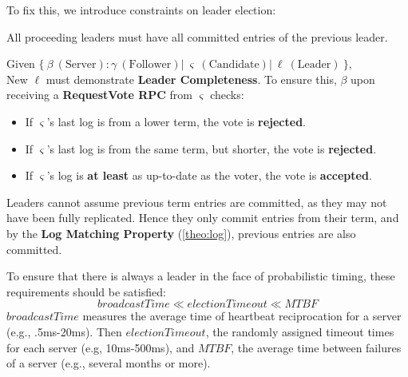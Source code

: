 \noindent
To fix this, we introduce constraints on leader election:

\begin{Def}

    All proceeding leaders must have all committed entries of the previous leader.
\end{Def}

\begin{Def}

    Given $\{\ \beta\ (\text{Server}): \gamma\ (\text{Follower})  |\ \varsigma\ (\text{Candidate}) |\ \ell\ (\text{Leader})\ \}$,\\
    New $\ell$ must demonstrate \textbf{Leader Completeness}. To ensure this, $\beta$ upon receiving a \textbf{RequestVote RPC} from $\varsigma$ checks:
    \begin{itemize}
        \item If $\varsigma$'s last log is from a lower term, the vote is \textbf{rejected}.
        \item If $\varsigma$'s last log is from the same term, but shorter, the vote is \textbf{rejected}.
        \item If $\varsigma$'s log is \textbf{at least} as up-to-date as the voter, the vote is \textbf{accepted}.
    \end{itemize}
\end{Def}

\begin{theo}

    Leaders cannot assume previous term entries are committed, as they may not have been fully replicated.
    Hence they only commit entries from their term, and by the \textbf{Log Matching Property} (\ref{theo:log}), previous entries are also committed.
\end{theo}

\begin{theo}

    To ensure that there is always a leader in the face of probabilistic timing, these 
    requirements should be satisfied:
    $$
    broadcastTime \ll electionTimeout \ll MTBF
    $$
    \noindent
    $broadcastTime$ measures the average time of heartbeat reciprocation for a server (e.g., .5ms-20ms).
    Then $electionTimeout$, the randomly assigned timeout times for each server (e.g, 10ms-500ms), and $MTBF$, the
    average time between failures of a server (e.g., several months or more).
\end{theo}

